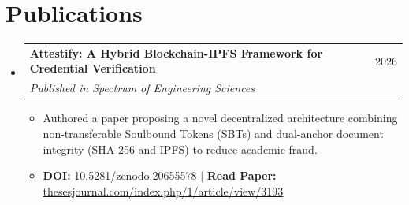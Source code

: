 \documentclass[letterpaper,11pt]{article}
\makeatletter
\newcommand{\resumeItem}[1]{
  \item\small{#1 \vspace{-2pt}}
}
\newcommand{\resumeSubheading}[4]{
  \vspace{-2pt}\item
    \begin{tabular*}{0.97\textwidth}[t]{l@{\extracolsep{\fill}}r}
      \textbf{#1} & #2 \\
      \textit{\small#3} & \textit{\small #4} \\
    \end{tabular*}\vspace{-7pt}
}
\newcommand{\resumeSubHeadingListStart}{\begin{itemize}[leftmargin=0.15in, label={}]}
\newcommand{\resumeSubHeadingListEnd}{\end{itemize}}
\newcommand{\resumeItemListStart}{\begin{itemize}}
\newcommand{\resumeItemListEnd}{\end{itemize}\vspace{-5pt}}
\makeatother
\begin{document}
\section{Publications}
\resumeSubHeadingListStart
  \resumeSubheading
    {Attestify: A Hybrid Blockchain-IPFS Framework for Credential Verification}{2026}
    {Published in Spectrum of Engineering Sciences}{}
    \resumeItemListStart
      \resumeItem{Authored a paper proposing a novel decentralized architecture combining non-transferable Soulbound Tokens (SBTs) and dual-anchor document integrity (SHA-256 and IPFS) to reduce academic fraud.}
      \resumeItem{\textbf{DOI:} \href{https://doi.org/10.5281/zenodo.20655578}{10.5281/zenodo.20655578} $|$ \textbf{Read Paper:} \href{https://thesesjournal.com/index.php/1/article/view/3193}{thesesjournal.com/index.php/1/article/view/3193}}
    \resumeItemListEnd
\resumeSubHeadingListEnd
\end{document}
